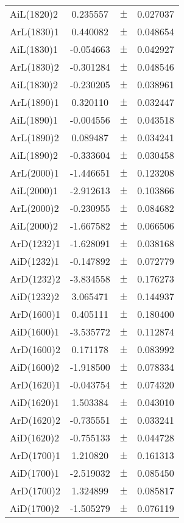 \begin{table}
\begin{tiny}
\begin{tabular}{lccc}
AiL(1820)2 & 0.235557 & $\pm$ & 0.027037 \\
ArL(1830)1 & 0.440082 & $\pm$ & 0.048654 \\
AiL(1830)1 & -0.054663 & $\pm$ & 0.042927 \\
ArL(1830)2 & -0.301284 & $\pm$ & 0.048546 \\
AiL(1830)2 & -0.230205 & $\pm$ & 0.038961 \\
ArL(1890)1 & 0.320110 & $\pm$ & 0.032447 \\
AiL(1890)1 & -0.004556 & $\pm$ & 0.043518 \\
ArL(1890)2 & 0.089487 & $\pm$ & 0.034241 \\
AiL(1890)2 & -0.333604 & $\pm$ & 0.030458 \\
ArL(2000)1 & -1.446651 & $\pm$ & 0.123208 \\
AiL(2000)1 & -2.912613 & $\pm$ & 0.103866 \\
ArL(2000)2 & -0.230955 & $\pm$ & 0.084682 \\
AiL(2000)2 & -1.667582 & $\pm$ & 0.066506 \\
ArD(1232)1 & -1.628091 & $\pm$ & 0.038168 \\
AiD(1232)1 & -0.147892 & $\pm$ & 0.072779 \\
ArD(1232)2 & -3.834558 & $\pm$ & 0.176273 \\
AiD(1232)2 & 3.065471 & $\pm$ & 0.144937 \\
ArD(1600)1 & 0.405111 & $\pm$ & 0.180400 \\
AiD(1600)1 & -3.535772 & $\pm$ & 0.112874 \\
ArD(1600)2 & 0.171178 & $\pm$ & 0.083992 \\
AiD(1600)2 & -1.918500 & $\pm$ & 0.078334 \\
ArD(1620)1 & -0.043754 & $\pm$ & 0.074320 \\
AiD(1620)1 & 1.503384 & $\pm$ & 0.043010 \\
ArD(1620)2 & -0.735551 & $\pm$ & 0.033241 \\
AiD(1620)2 & -0.755133 & $\pm$ & 0.044728 \\
ArD(1700)1 & 1.210820 & $\pm$ & 0.161313 \\
AiD(1700)1 & -2.519032 & $\pm$ & 0.085450 \\
ArD(1700)2 & 1.324899 & $\pm$ & 0.085817 \\
AiD(1700)2 & -1.505279 & $\pm$ & 0.076119 \\
\bottomrule
\end{tabular}
\end{tiny}
\end{table}

